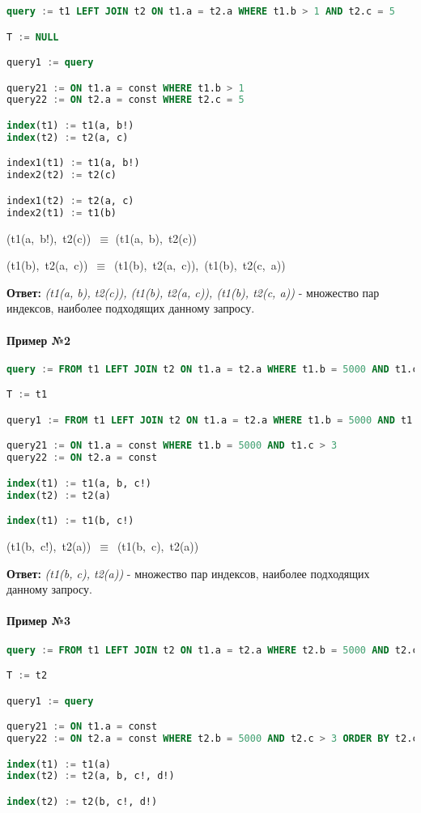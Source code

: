 \begin{lstlisting}[language=SQL]
query := t1 LEFT JOIN t2 ON t1.a = t2.a WHERE t1.b > 1 AND t2.c = 5

T := NULL 

query1 := query 

query21 := ON t1.a = const WHERE t1.b > 1 
query22 := ON t2.a = const WHERE t2.c = 5

index(t1) := t1(a, b!) 
index(t2) := t2(a, c) 

index1(t1) := t1(a, b!) 
index2(t2) := t2(c) 

index1(t2) := t2(a, c) 
index2(t1) := t1(b) 
\end{lstlisting}

(t1(a, b!), t2(c)) $\equiv$ (t1(a, b), t2(c)) 

(t1(b), t2(a, c)) $\equiv$ (t1(b), t2(a, c)), (t1(b), t2(c, a)) 

\textbf{Ответ:} \textit{(t1(a, b), t2(c)), (t1(b), t2(a, c)), (t1(b), t2(c, a))} - множество пар индексов, наиболее подходящих данному запросу. 


\paragraph{Пример №2}
\begin{lstlisting}[language=SQL]
query := FROM t1 LEFT JOIN t2 ON t1.a = t2.a WHERE t1.b = 5000 AND t1.c > 3 ORDER BY t2.c, t2.d

T := t1 

query1 := FROM t1 LEFT JOIN t2 ON t1.a = t2.a WHERE t1.b = 5000 AND t1.c > 3

query21 := ON t1.a = const WHERE t1.b = 5000 AND t1.c > 3 
query22 := ON t2.a = const

index(t1) := t1(a, b, c!) 
index(t2) := t2(a) 

index(t1) := t1(b, c!) 
\end{lstlisting}
 
(t1(b, c!), t2(a)) $\equiv$ {(t1(b, c), t2(a))} 

\textbf{Ответ:} \textit{(t1(b, c), t2(a))} - множество пар индексов, наиболее подходящих данному запросу.


\paragraph{Пример №3}
\begin{lstlisting}[language=SQL]
query := FROM t1 LEFT JOIN t2 ON t1.a = t2.a WHERE t2.b = 5000 AND t2.c > 3 ORDER BY t2.c, t2.d

T := t2

query1 := query 

query21 := ON t1.a = const 
query22 := ON t2.a = const WHERE t2.b = 5000 AND t2.c > 3 ORDER BY t2.c, t2.d 

index(t1) := t1(a) 
index(t2) := t2(a, b, c!, d!) 

index(t2) := t2(b, c!, d!) 
\end{lstlisting}


